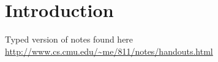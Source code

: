     \chapter{Introduction}
    
    Typed version of notes found here \url{http://www.cs.cmu.edu/~me/811/notes/handouts.html}